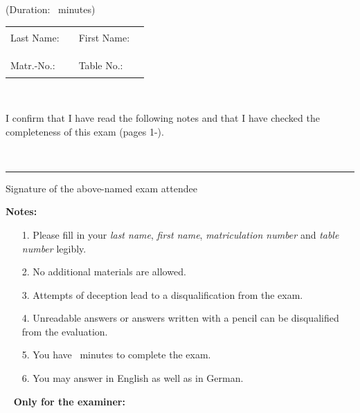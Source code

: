 {
{\Large
\begin{center}
	
	\textbf{\klausurname} 
	
	(Duration: \klausurminuten \ minutes)
\end{center}
}

{\large
\vspace{1cm}
\begin{tabular}{llll}
Last Name: & \rule{4cm}{1pt} & First Name: & \rule{4.5cm}{1pt}  \\
&&& \\
Matr.-No.: & \rule{4cm}{1pt} & Table No.: & \rule{4.5cm}{1pt} \\
\end{tabular}
}

~\vspace{0.0cm}

I confirm that I have read the following notes and that I have checked the com\-plete\-ness
of this exam (pages 1-\pageref{LastPage}).

~\vspace{0.5cm}

\begin{flushright}
\begin{minipage}{8cm}
\rule{\textwidth}{0.5pt}
Signature of the above-named exam attendee
\end{minipage}
\end{flushright}

\textbf{Notes:}

\begin{itemize}
	\item[1.] Please fill in your \emph{last name}, \emph{first name}, \emph{matriculation number} and \emph{table number} legibly.
	\item[2.] No additional materials are allowed.
	\item[3.] Attempts of deception lead to a disqualification from the exam.
	\item[4.] Unreadable answers or answers written with a pencil can be disqualified from the evaluation.
	\item[5.] You have \klausurminuten\ minutes to complete the exam.
	\item[6.] You may answer in English as well as in German.
\end{itemize}
~
\smallbreak
{\footnotesize
\textbf{Only for the examiner:}
}
}

